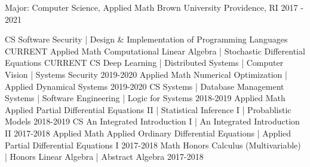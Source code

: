\begin{cventries}
  \cventry
    {Major: Computer Science, Applied Math}
    {Brown University}
    {Providence, RI}
    {2017 - 2021}
    {
        \vspace{-2em}
        \begin{cvhonors}
			\cvhonor
			{CS}
            {Software Security | Design \& Implementation of Programming Languages}
			{}
            {CURRENT}
			\cvhonor
			{Applied Math}
            {Computational Linear Algebra | Stochastic Differential Equations}
			{}
            {CURRENT}
			\cvhonor
			{CS}
            {Deep Learning | Distributed Systems | Computer Vision | Systems Security}
			{}
			{2019-2020}
			\cvhonor
			{Applied Math}
			{Numerical Optimization | Applied Dynamical Systems}
			{}
			{2019-2020}
			\cvhonor
			{CS}
			{Systems | Database Management Systems | Software Engineering | Logic for Systems}
			{}
			{2018-2019}
			\cvhonor
			{Applied Math}
            {Applied Partial Differential Equations II | Statistical Inference I | Probablistic Models}
			{}
			{2018-2019}
			\cvhonor
			{CS}
			{An Integrated Introduction I | An Integrated Introduction II}
			{}
			{2017-2018}
			\cvhonor
			{Applied Math}
			{Applied Ordinary Differential Equations | Applied Partial Differential Equations I}
			{}
			{2017-2018}
			\cvhonor
			{Math}
			{Honors Calculus (Multivariable) | Honors Linear Algebra | Abstract Algebra}
			{}
			{2017-2018}
        \end{cvhonors}
		\vspace{-1.25em}
    }
\end{cventries}


